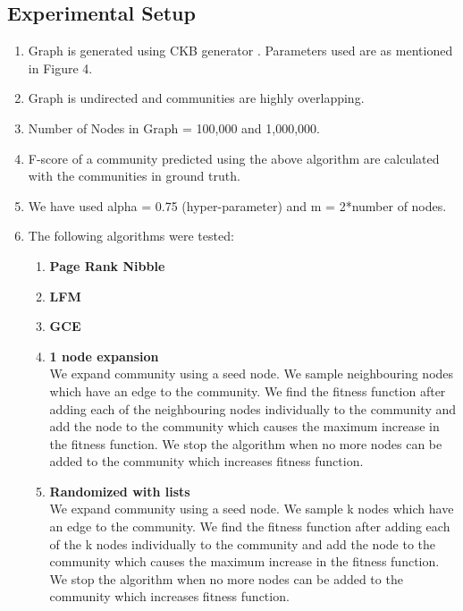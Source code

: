 \documentclass[a4paper]{article}
\newcommand\descitem[1]{\item{\bfseries #1}\\}
\begin{document}
\subsection{Experimental Setup}
\begin{enumerate}
 \item Graph is generated using CKB generator \cite{10.1007/978-3-319-05401-8_19}. Parameters used are as mentioned in Figure 4.
 \item Graph is undirected and communities are highly overlapping.
 \item Number of Nodes in Graph = 100,000 and 1,000,000.
 
 \item F-score of a community predicted using the above algorithm are calculated with the communities in ground truth.
 \item We have used alpha = 0.75 (hyper-parameter) and m = 2*number of nodes.
 \item The following algorithms were tested:
 
 \begin{enumerate}
 
  \descitem{Page Rank Nibble \cite{PRN}} 
 
 \descitem{LFM \cite{lancichinetti:2008}} %
  \descitem{GCE \cite{lee:2010}} %
  \descitem{1 node expansion} We expand community using a seed node. We sample neighbouring nodes which have an edge to the community. We find the fitness function after adding each of the neighbouring nodes individually to the community and add the node to the community which causes the maximum increase in the fitness function. We stop the algorithm when no more nodes can be added to the community which increases fitness function.
  \descitem{Randomized with lists} We expand community using a seed node. We sample k nodes which have an edge to the community. We find the fitness function after adding each of the k nodes individually to the community and add the node to the community which causes the maximum increase in the fitness function. We stop the algorithm when no more nodes can be added to the community which increases fitness function.     
 

\end{enumerate}
\end{enumerate}
\end{document}
